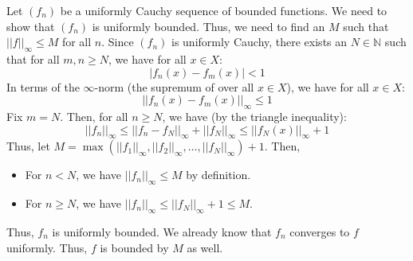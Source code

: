 \documentclass[12pt]{article}
\begin{document}
\begin{solution}
    Let $(f_n)$ be a uniformly Cauchy sequence of bounded functions. We need to show that $(f_n)$ is uniformly bounded. Thus, we need to find an $M$ such that $||f||_\infty \leq M$ for all $n$. \bbni
    Since $(f_n)$ is uniformly Cauchy, there exists an $N \in \mathbb{N}$ such that for all $m, n \geq N$, we have for all $x \in X$:
    \[ |f_n(x) - f_m(x)| < 1 \]
    In terms of the $\infty$-norm (the supremum of over all $x \in X$), we have for all $x \in X$:
    \[ ||f_n(x) - f_m(x)||_\infty \leq 1 \]
    Fix $m = N$. Then, for all $n \geq N$, we have (by the triangle inequality):
    \[ ||f_n||_\infty \leq ||f_n-f_N||_\infty + ||f_N||_\infty \leq ||f_N(x)||_\infty + 1\]
    Thus, let $M = \max(||f_1||_\infty, ||f_2||_\infty, \ldots, ||f_N||_\infty)+1$. Then, 
    \begin{itemize}
        \item For $n < N$, we have $||f_n||_\infty \leq M$ by definition.
        \item For $n \geq N$, we have $||f_n||_\infty \leq ||f_N||_\infty + 1 \leq M$. 
    \end{itemize}
    Thus, $f_n$ is uniformly bounded. We already know that $f_n$ converges to $f$ uniformly. Thus, $f$ is bounded by $M$ as well. 
\end{solution}
\end{document}
